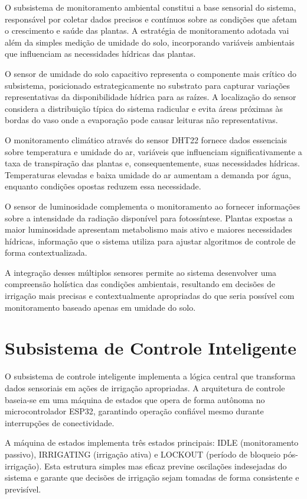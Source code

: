 O subsistema de monitoramento ambiental constitui a base sensorial do sistema, responsável por coletar dados precisos e contínuos sobre as condições que afetam o crescimento e saúde das plantas. A estratégia de monitoramento adotada vai além da simples medição de umidade do solo, incorporando variáveis ambientais que influenciam as necessidades hídricas das plantas.

O sensor de umidade do solo capacitivo representa o componente mais crítico do subsistema, posicionado estrategicamente no substrato para capturar variações representativas da disponibilidade hídrica para as raízes. A localização do sensor considera a distribuição típica do sistema radicular e evita áreas próximas às bordas do vaso onde a evaporação pode causar leituras não representativas.

O monitoramento climático através do sensor DHT22 fornece dados essenciais sobre temperatura e umidade do ar, variáveis que influenciam significativamente a taxa de transpiração das plantas e, consequentemente, suas necessidades hídricas. Temperaturas elevadas e baixa umidade do ar aumentam a demanda por água, enquanto condições opostas reduzem essa necessidade.

O sensor de luminosidade complementa o monitoramento ao fornecer informações sobre a intensidade da radiação disponível para fotossíntese. Plantas expostas a maior luminosidade apresentam metabolismo mais ativo e maiores necessidades hídricas, informação que o sistema utiliza para ajustar algoritmos de controle de forma contextualizada.

A integração desses múltiplos sensores permite ao sistema desenvolver uma compreensão holística das condições ambientais, resultando em decisões de irrigação mais precisas e contextualmente apropriadas do que seria possível com monitoramento baseado apenas em umidade do solo.

\section{Subsistema de Controle Inteligente}

O subsistema de controle inteligente implementa a lógica central que transforma dados sensoriais em ações de irrigação apropriadas. A arquitetura de controle baseia-se em uma máquina de estados que opera de forma autônoma no microcontrolador ESP32, garantindo operação confiável mesmo durante interrupções de conectividade.

A máquina de estados implementa três estados principais: IDLE (monitoramento passivo), IRRIGATING (irrigação ativa) e LOCKOUT (período de bloqueio pós-irrigação). Esta estrutura simples mas eficaz previne oscilações indesejadas do sistema e garante que decisões de irrigação sejam tomadas de forma consistente e previsível.


